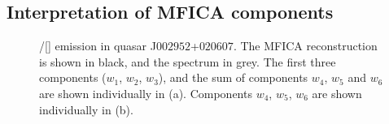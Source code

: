 \subsection{Interpretation of MFICA components}

\begin{figure}[t!]
   \captionsetup[subfigure]{labelformat=empty}
    \centering
    \subfloat[\label{fig:mfica_components_a}]{}
    \subfloat[\label{fig:mfica_components_b}]{}
    \caption[{MFICA reconstruction of the \hbns/[] emission in quasar J$002952$+$020607$.}]{\hbns/[] emission in quasar J$002952$+$020607$. The MFICA reconstruction is shown in black, and the spectrum in grey. The first three components ($w_1$, $w_2$, $w_3$), and the sum of components $w_4$, $w_5$ and $w_6$ are shown individually in (a). Components $w_4$, $w_5$, $w_6$ are shown individually in (b).}     
    \label{fig:mfica_components}
\end{figure}

